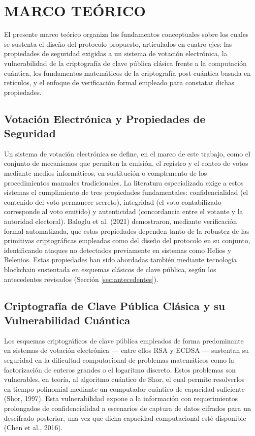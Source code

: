 \section{MARCO TEÓRICO}

El presente marco teórico organiza los fundamentos conceptuales sobre los cuales se sustenta el diseño del protocolo propuesto, articulados en cuatro ejes: las propiedades de seguridad exigidas a un sistema de votación electrónica, la vulnerabilidad de la criptografía de clave pública clásica frente a la computación cuántica, los fundamentos matemáticos de la criptografía post-cuántica basada en retículos, y el enfoque de verificación formal empleado para constatar dichas propiedades. 

\subsection{Votación Electrónica y Propiedades de Seguridad}

Un sistema de votación electrónica se define, en el marco de este trabajo, como el conjunto de mecanismos que permiten la emisión, el registro y el conteo de votos mediante medios informáticos, en sustitución o complemento de los procedimientos manuales tradicionales. La literatura especializada exige a estos sistemas el cumplimiento de tres propiedades fundamentales: confidencialidad (el contenido del voto permanece secreto), integridad (el voto contabilizado corresponde al voto emitido) y autenticidad (concordancia entre el votante y la autoridad electoral). Baloglu et al. (2021) demostraron, mediante verificación formal automatizada, que estas propiedades dependen tanto de la robustez de las primitivas criptográficas empleadas como del diseño del protocolo en su conjunto, identificando ataques no detectados previamente en sistemas como Helios y Belenios. Estas propiedades han sido abordadas también mediante tecnología blockchain sustentada en esquemas clásicos de clave pública, según los antecedentes revisados (Sección \ref{sec:antecedentes}).

\subsection{Criptografía de Clave Pública Clásica y su Vulnerabilidad Cuántica}

Los esquemas criptográficos de clave pública empleados de forma predominante en sistemas de votación electrónica --- entre ellos RSA y ECDSA --- sustentan su seguridad en la dificultad computacional de problemas matemáticos como la factorización de enteros grandes o el logaritmo discreto. Estos problemas son vulnerables, en teoría, al algoritmo cuántico de Shor, el cual permite resolverlos en tiempo polinomial mediante un computador cuántico de capacidad suficiente (Shor, 1997). Esta vulnerabilidad expone a la información con requerimientos prolongados de confidencialidad a escenarios de captura de datos cifrados para un descifrado posterior, una vez que dicha capacidad computacional esté disponible (Chen et al., 2016).

